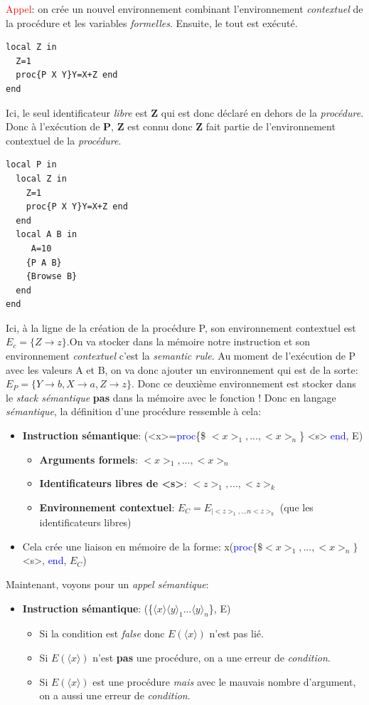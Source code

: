 \documentclass{report}
\begin{document}
\textcolor{red}{Appel}: on crée un nouvel environnement combinant l'environnement \textit{contextuel} de la procédure et les variables \textit{formelles}. Ensuite, le tout est exécuté.
\begin{lstlisting}
local Z in 
  Z=1
  proc{P X Y}Y=X+Z end
end
\end{lstlisting}
Ici, le seul identificateur \textit{libre} est \textbf{Z} qui est donc déclaré en dehors de la \textit{procédure}. Donc à l'exécution de \textbf{P}, \textbf{Z} est connu donc \textbf{Z} fait partie de l'environnement contextuel de la \textit{procédure}.
\begin{lstlisting}
local P in
  local Z in 
    Z=1
    proc{P X Y}Y=X+Z end
  end
  local A B in
     A=10
    {P A B}
    {Browse B}
  end
end 
\end{lstlisting}
Ici, à la ligne de la création de la procédure P, son environnement contextuel est $E_c = \{Z \rightarrow z\}$.On va stocker dans la mémoire notre instruction et son environnement \textit{contextuel} c'est la \textit{semantic rule}. Au moment de l'exécution de P avec les valeurs A et B, on va donc ajouter un environnement qui est de la sorte: $E_P = \{Y \rightarrow b, X \rightarrow a, Z \rightarrow z\}$. Donc ce deuxième environnement est stocker dans le \textit{stack sémantique} \textbf{pas} dans la mémoire avec le fonction !
Donc en langage \textit{sémantique}, la définition d'une procédure ressemble à cela:
\begin{itemize}
\item \textbf{Instruction sémantique}: (<x>=\textcolor{blue}{proc}\{\$ $<x>_1, ..., <x>_n$\} <s> \textcolor{blue}{end}, E)
\begin{itemize}
\item \textbf{Arguments formels}: $<x>_1, ..., <x>_n$
\item \textbf{Identificateurs libres de <s>}: $<z>_1, ..., <z>_k$
\item \textbf{Environnement contextuel}: $E_C = E_{|<z>_1, ...n <z>_k}$ (que les identificateurs libres)
\end{itemize}
\item Cela crée une liaison en mémoire de la forme: x(\textcolor{blue}{proc}$\{\$<x>_1, ..., <x>_n\}$<s>, \textcolor{blue}{end}, $E_C$)
\end{itemize}
Maintenant, voyons pour un \textit{appel sémantique}:
\begin{itemize}
\item \textbf{Instruction sémantique}: (\{$\langle x \rangle \langle y \rangle_1 ... \langle y \rangle_n$\}, E)
\begin{itemize}
\item Si la condition est \textit{false} donc $E(\langle x \rangle)$ n'est pas lié.
\item Si $E(\langle x \rangle)$ n'est \textbf{pas} une procédure, on a une erreur de \textit{condition}.
\item Si $E(\langle x \rangle)$ est une procédure \textit{mais} avec le mauvais nombre d'argument, on a aussi une erreur de \textit{condition}.
\end{itemize}
\end{itemize}
\end{document}
